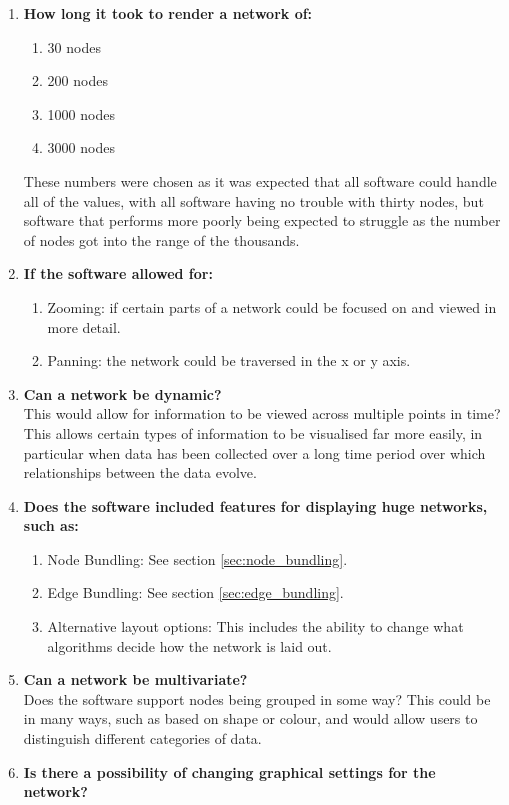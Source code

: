 \documentclass[../dissertation.tex]{subfiles}
\begin{document}
\begin{enumerate}
	\item \textbf{How long it took to render a network of:}
	\begin{enumerate}
	    \item 30 nodes
	    \item 200 nodes
	    \item 1000 nodes
	    \item 3000 nodes
	\end{enumerate}
	These numbers were chosen as it was expected that all software could handle all of the values, with all software having no trouble with thirty nodes, but software that performs more poorly being expected to struggle as the number of nodes got into the range of the thousands. 
	\item \textbf{If the software allowed for:}
	\begin{enumerate}
		\item Zooming: if certain parts of a network could be focused on and viewed in more detail.
		\item Panning: the network could be traversed in the x or y axis.
	\end{enumerate}
	\item \textbf{Can a network be dynamic?}\\
	This would allow for information to be viewed across multiple points in time? This allows certain types of information to be visualised far more easily, in particular when data has been collected over a long time period over which relationships between the data evolve.
	\item \textbf{Does the software included features for displaying huge networks, such as:}
	\begin{enumerate} 
		\item Node Bundling: See section \ref{sec:node_bundling}.
		\item Edge Bundling: See section \ref{sec:edge_bundling}.
		\item Alternative layout options: This includes the ability to change what algorithms decide how the network is laid out.
	\end{enumerate}
	\item \textbf{Can a network be multivariate?}\\
	Does the software support nodes being grouped in some way? This could be in many ways, such as based on shape or colour, and would allow users to distinguish different categories of data.
	\item \textbf{Is there a possibility of changing graphical settings for the network?}\\

\end{enumerate}
\end{document}
